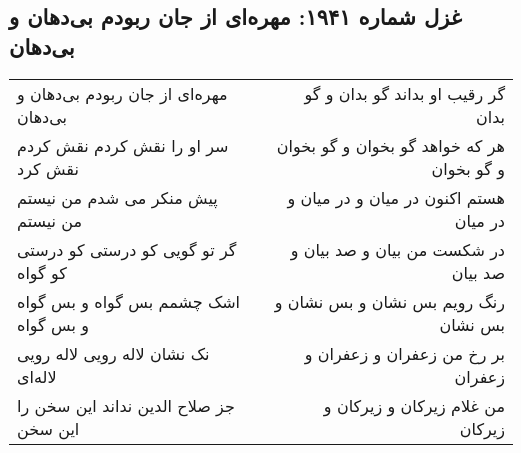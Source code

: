 \begin{center}
\section*{غزل شماره ۱۹۴۱: مهره‌ای از جان ربودم بی‌دهان و بی‌دهان}
\label{sec:1941}
\begin{longtable}{l p{0.5cm} r}
مهره‌ای از جان ربودم بی‌دهان و بی‌دهان
&&
گر رقیب او بداند گو بدان و گو بدان
\\
سر او را نقش کردم نقش کردم نقش کرد
&&
هر که خواهد گو بخوان و گو بخوان و گو بخوان
\\
پیش منکر می شدم من نیستم من نیستم
&&
هستم اکنون در میان و در میان و در میان
\\
گر تو گویی کو درستی کو درستی کو گواه
&&
در شکست من بیان و صد بیان و صد بیان
\\
اشک چشمم بس گواه و بس گواه و بس گواه
&&
رنگ رویم بس نشان و بس نشان و بس نشان
\\
نک نشان لاله رویی لاله رویی لاله‌ای
&&
بر رخ من زعفران و زعفران و زعفران
\\
جز صلاح الدین نداند این سخن را این سخن
&&
من غلام زیرکان و زیرکان و زیرکان
\\
\end{longtable}
\end{center}
